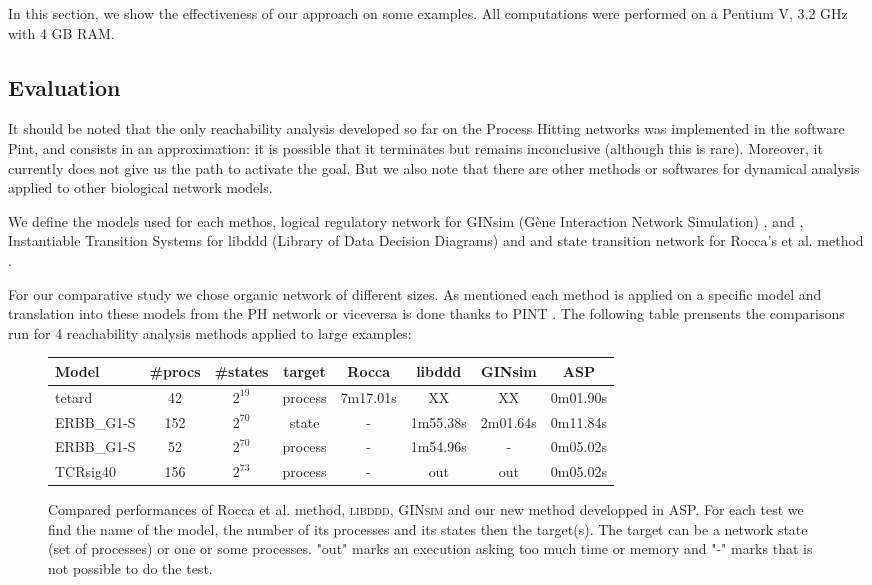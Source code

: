 In this section, we show the effectiveness of our approach on some examples. All
computations were performed on a Pentium V, 3.2 GHz with 4 GB RAM.

\subsection{Evaluation}
It should be noted that the only reachability analysis developed so far on the Process Hitting networks was implemented in the software Pint, and consists in an approximation: it is possible that it terminates but remains inconclusive (although this is rare). Moreover, it currently does not give us the path to activate the goal. But we also note that there are other methods or softwares for dynamical analysis applied to other biological network models.

We define the models used for each methos, logical regulatory network for GINsim (Gène Interaction Network
Simulation) \cite{gonzalez2006ginsim}, \cite{naldi2009logical} and \cite{naldi2007decision}, Instantiable Transition Systems for libddd (Library of Data Decision
Diagrams) \cite{thierry2009hierarchical} and \cite{colange2013towards} and state transition network for Rocca's et al. method \cite{roccaasp}.

For our comparative study we chose organic network of different sizes. As mentioned each method is applied on a specific model and translation into these models from the PH network or viceversa is done thanks to PINT \cite{pauleve2011modelisation}.
The following table prensents the comparisons run for 4 reachability analysis methods  applied to large examples:
\begin{center}

\begin{figure}
\label{tab:reachability}
\noindent
\begin{tabular}{|l||c|c|c||c|c|c|c|}
  \hline
   Model& \#procs & \#states & target & Rocca & libddd & GINsim & ASP \\
  \hline
  tetard \cite{khalis2009smbionet} & 42 & $2^{19}$ & process & 7m17.01s & XX & XX & 0m01.90s \\
  \hline
  ERBB\_G1-S \cite{Samaga2009}  & 152 & $2^{70}$ & state & - &1m55.38s & 2m01.64s & 0m11.84s \\
  \hline
  ERBB\_G1-S & 52 & $2^{70}$ & process & - &1m54.96s & - & 0m05.02s \\
  \hline
  TCRsig40 \cite{Klamt06} & 156 & $2^{73}$ & process & - & out & out & 0m05.02s \\
  \hline
\end{tabular}
\caption{Compared performances of Rocca et al. method, \textsc{libddd}, \textsc{GINsim} and our new method developped in ASP. For each test we find the name of the model, the number of its processes and its states then the target(s). The target can be a network state (set of processes) or one or some processes. "out" marks an execution asking too much time or memory and "-" marks that is not possible to do the test.
}
\end{figure}
\end{center}

